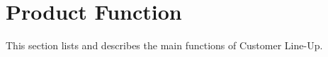 \section{Product Function}

This section lists and describes the main functions of Customer Line-Up.

 
 
 
 